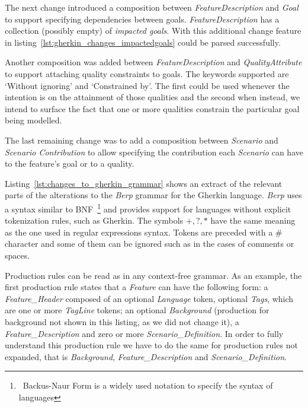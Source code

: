 \documentclass[dissertation,final]{softeng}
\begin{document}
The next change introduced a composition between \emph{FeatureDescription} and \emph{Goal} to support specifying dependencies between goals. \emph{FeatureDescription} has a collection (possibly empty) of \emph{impacted goals}. With this additional change feature in listing~\ref{lst:gherkin_changes_impactedgoals} could be parsed successfully.

Another composition was added between \emph{FeatureDescription} and \emph{QualityAttribute} to support attaching quality constraints to goals. The keywords supported are `Without ignoring' and `Constrained by'. The first could be used whenever the intention is on the attainment of those qualities and the second when instead, we intend to surface the fact that one or more qualities constrain the particular goal being modelled.

The last remaining change was to add a composition between \emph{Scenario} and \emph{Scenario Contribution} to allow specifying the contribution each \emph{Scenario} can have to the feature's goal or to a quality.

Listing~\ref{lst:changes_to_gherkin_grammar} shows an extract of the relevant parts of the alterations to the \emph{Berp} grammar for the Gherkin language. \emph{Berp} uses a syntax similar to BNF~\footnote{~Backus-Naur Form is a widely used notation to specify the syntax of languages} and provides support for languages without explicit tokenization rules, such as Gherkin. The symbols $+, ?, *$ have the same meaning as the one used in regular expressions syntax. Tokens are preceded with a \# character and some of them can be ignored such as in the cases of comments or spaces.

Production rules can be read as in any context-free grammar. As an example, the first production rule states that a \emph{Feature} can have the following form: a \emph{Feature\_Header} composed of an optional \emph{Language} token, optional \emph{Tags}, which are one or more \emph{TagLine} tokens; an optional \emph{Background} (production for background not shown in this listing, as we did not change it), a \emph{Feature\_Description} and zero or more \emph{Scenario\_Definition}. In order to fully understand this production rule we have to do the same for production rules not expanded, that is \emph{Background}, \emph{Feature\_Description} and \emph{Scenario\_Definition}.
\end{document}
